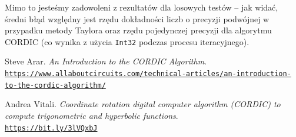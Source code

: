 \documentclass{mwart}
\theoremstyle{remark}
\theoremstyle{definition}
\theoremstyle{definition}
\begin{document}
Mimo to jesteśmy zadowoleni z rezultatów dla losowych testów -- jak widać, średni błąd względny jest rzędu dokładności liczb o precyzji podwójnej w przypadku metody Taylora oraz rzędu pojedynczej precyzji dla algorytmu CORDIC (co wynika z użycia \texttt{Int32} podczas procesu iteracyjnego).

\begin{thebibliography}{9}
  Steve Arar.
  \textit{An Introduction to the CORDIC Algorithm}. 
  \\\texttt{\url{https://www.allaboutcircuits.com/technical-articles/an-introduction-to-the-cordic-algorithm/}}
  
  Andrea Vitali.
  \textit{Coordinate rotation digital computer algorithm (CORDIC)
    to compute trigonometric and hyperbolic functions}.
  \\\texttt{\url{https://bit.ly/3lVQxbJ}}
\end{thebibliography}
\end{document}
